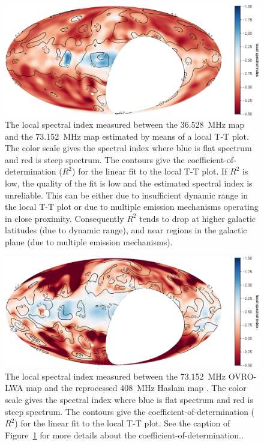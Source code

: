 \documentclass[twocolumn]{aastex61}
\begin{document}
\begin{figure}[t]
    \centering
    \includegraphics[width=\textwidth]{figures/spectral-index/better-internal-spectral-index}
    \caption{
        The local spectral index measured between the 36.528~MHz map and the 73.152~MHz map
        estimated by means of a local T-T plot. The color scale gives the spectral index where blue
        is flat spectrum and red is steep spectrum. The contours give the
        coefficient-of-determination ($R^2$) for the linear fit to the local T-T plot. If $R^2$ is
        low, the quality of the fit is low and the estimated spectral index is unreliable. This can
        be either due to insufficient dynamic range in the local T-T plot or due to multiple
        emission mechanisms operating in close proximity. Consequently $R^2$ tends to drop at higher
        galactic latitudes (due to dynamic range), and near  regions in the galactic
        plane (due to multiple emission mechanisms).
    }
    \label{fig:internal-spectral-index}
\end{figure}

\begin{figure}[t]
    \centering
    \includegraphics[height=0.32\textheight]{figures/haslam/better-haslam-spectral-index}
    \caption{
        The local spectral index measured between the 73.152~MHz OVRO-LWA map and the reprocessed
        408~MHz Haslam map \citep{2015MNRAS.451.4311R}.  The color scale gives the spectral index
        where blue is flat spectrum and red is steep spectrum. The contours give the
        coefficient-of-determination ($R^2$) for the linear fit to the local T-T plot. See the
        caption of Figure~\ref{fig:internal-spectral-index} for more details about the
        coefficient-of-determination..
    }
    \label{fig:haslam-spectral-index}
\end{figure}
\end{document}
